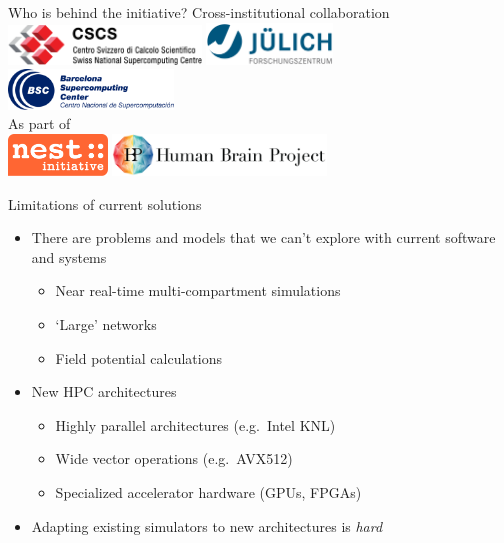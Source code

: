 \documentclass[aspectratio=1610,14pt]{beamer}
\begin{document}
\begin{frame}{Who is behind the initiative?}
  \centering
  \vspace{1ex}
  {\large Cross-institutional collaboration}\\[2ex]
  \includegraphics[height=2.8em]{logos/cscs_logo.pdf}
  \hspace{15mm}
  \includegraphics[height=3em]{logos/julich_logo.pdf}
  \hspace*{5mm}
  \\[1.4em]
  \includegraphics[height=2.9em]{logos/bsc_logo.pdf}\\

  \vfill
  {\large As part of}\\[2ex]
  \includegraphics[height=3em]{logos/nest-initiative.pdf}
  \hspace{15mm}
  \includegraphics[height=3em]{logos/HBP_logo.jpg}
  \vspace*{1em}
\end{frame}

\begin{frame}{Limitations of current solutions}
  \begin{itemize}
  \item There are problems and models that we can't explore with current software and systems
    \begin{itemize}
    \item Near real-time multi-compartment simulations
    \item `Large' networks
    \item Field potential calculations
    \end{itemize}
  \item New HPC architectures
    \begin{itemize}
    \item Highly parallel architectures (e.g.\ Intel KNL)
    \item Wide vector operations (e.g.\  AVX512)
    \item Specialized accelerator hardware (GPUs, FPGAs)
    \end{itemize}
  \item Adapting existing simulators to new architectures is \emph{hard}
  \end{itemize}
\end{frame}
\end{document}
